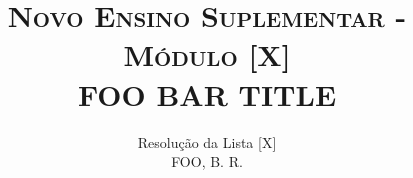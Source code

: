 \thispagestyle{empty}

\title{\textsc{\large Novo Ensino Suplementar - Módulo [X]} \\ 
       \Huge \textbf{FOO BAR TITLE}}
\author{\Large Resolução da Lista [X] \\ 
        \textsc{FOO, B. R.}}
\date{}  %

